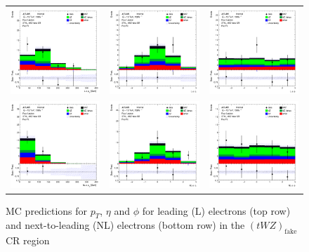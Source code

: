 \begin{figure}[htbp]
    \centering
  \begin{tabular}{ccc}


    \includegraphics[width=.2\textwidth]{figures/PreFitPlots/lep4_tWZ_3T1L_L_el_pt} &
    \includegraphics[width=.2\textwidth]{figures/PreFitPlots/lep4_tWZ_3T1L_L_el_eta} &
    \includegraphics[width=.2\textwidth]{figures/PreFitPlots/lep4_tWZ_3T1L_L_el_phi} \\
    \includegraphics[width=.2\textwidth]{figures/PreFitPlots/lep4_tWZ_3T1L_NL_el_pt} &
    \includegraphics[width=.2\textwidth]{figures/PreFitPlots/lep4_tWZ_3T1L_NL_el_eta} &
    \includegraphics[width=.2\textwidth]{figures/PreFitPlots/lep4_tWZ_3T1L_NL_el_phi} \\

  \end{tabular}
    \caption{MC predictions for $p_{T}$, $\eta$ and $\phi$ for leading (L) electrons (top row) and next-to-leading (NL) electrons (bottom row) in the $(tWZ)_{\text{fake}}$ CR region }
  \label{fig:4lep-3T1L-CR-electronPlots}
\end{figure}



